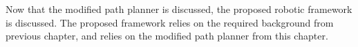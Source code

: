 Now that the modified path planner is discussed, the proposed robotic framework is discussed. The proposed framework relies on the required background from previous chapter, and relies on the modified path planner from this chapter.\bs









